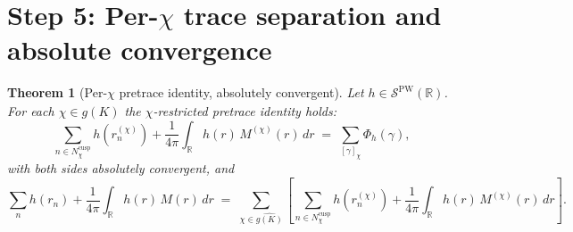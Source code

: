 \documentclass[11pt,a4paper,reqno]{amsart}
\newtheorem{theorem}{Theorem}[section]
\theoremstyle{definition}
\newcommand{\RR}{\mathbb{R}}
\newcommand{\dualgK}{\widehat{g(K)}}
\newcommand{\PW}{\mathcal{S}^{\mathrm{PW}}}
\begin{document}
\section{Step 5: Per-$\chi$ trace separation and absolute convergence}\label{sec:step5}

\begin{theorem}[Per-$\chi$ pretrace identity, absolutely convergent]\label{thm:perchi}
Let $h\in\PW(\RR)$. For each $\chi\in\dualgK$ the $\chi$-restricted pretrace identity holds:
\begin{equation}\label{eq:perchi}
  \sum_{n\in N_\chi^{\mathrm{cusp}}} h(r_n^{(\chi)})
  + \frac{1}{4\pi}\int_{\RR} h(r)\,M^{(\chi)}(r)\,dr
  \;=\; \sum_{[\gamma]_\chi}\Phi_h(\gamma),
\end{equation}
with both sides absolutely convergent, and
\begin{equation}\label{eq:globalfromperchi}
  \sum_n h(r_n) + \frac{1}{4\pi}\int_\RR h(r)\,M(r)\,dr
  \;=\; \sum_{\chi\in\dualgK}\!\left[
    \sum_{n\in N_\chi^{\mathrm{cusp}}} h(r_n^{(\chi)})
    + \frac{1}{4\pi}\int_\RR h(r)\,M^{(\chi)}(r)\,dr
  \right].
\end{equation}
\end{theorem}
\end{document}
